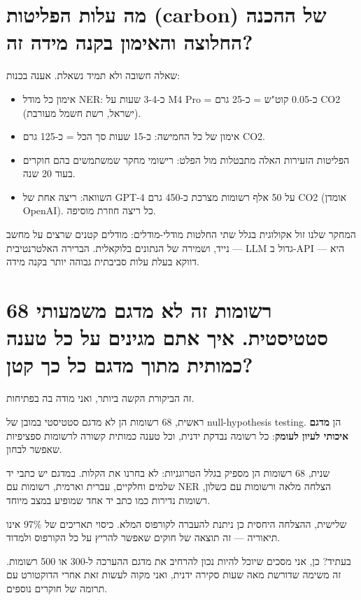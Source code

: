 \documentclass[12pt,a4paper]{article}
\begin{document}
\section{\texthebrew{מה עלות הפליטות (carbon) של ההכנה החלוצה והאימון בקנה מידה זה?}}
\begin{hebrew}
שאלה חשובה ולא תמיד נשאלת. אענה בכנות:
\begin{itemize}
  \item אימון כל מודל NER: כ-3-4 שעות על M4 Pro = כ-0.05 קוט"ש = כ-25 גרם CO2 (ישראל, רשת חשמל מעורבת).
  \item אימון של כל החמישה: כ-15 שעות סך הכל = כ-125 גרם CO2.
  \item הפליטות הזעירות האלה מתבטלות מול הפלט: רישומי מחקר שמשתמשים בהם חוקרים בעוד 20 שנה.
  \item השוואה: ריצה אחת של GPT-4 על 50 אלף רשומות מצרכת כ-450 גרם CO2 (אומדן OpenAI). כל ריצה חוזרת מוסיפה.
\end{itemize}
\par
המחקר שלנו זול אקולוגית בגלל שתי החלטות מודלי-מודלים: מודלים קטנים שרצים על מחשב נייד, ושמירה של הנתונים בלוקאלית. הברירה האלטרנטיבית — LLM גדול ב-API — היא דווקא בעלת עלות סביבתית גבוהה יותר בקנה מידה.
\end{hebrew}


\section{\texthebrew{68 רשומות זה לא מדגם משמעותי סטטיסטית. איך אתם מגינים על כל טענה כמותית מתוך מדגם כל כך קטן?}}
\begin{hebrew}
זה הביקורת הקשה ביותר, ואני מודה בה בפתיחות.
\par
ראשית, 68 רשומות הן לא מדגם סטטיסטי במובן של null-hypothesis testing. הן \textbf{מדגם איכותי לעיון לעומק}: כל רשומה נבדקת ידנית, וכל טענה כמותית קשורה לרשומות ספציפיות שאפשר לבחון.
\par
שנית, 68 רשומות הן מספיק בגלל הטרוגניות: לא בחרנו את הקלות. במדגם יש כתבי יד שלמים וחלקיים, עברית וארמית, רשומות עם NER הצלחה מלאה ורשומות עם כשלון, רשומות נדירות כמו כתב יד אחד שמופיע במצב מיוחד.
\par
שלישית, ההצלחה היחסית כן ניתנת להעברה לקורפוס המלא. כיסוי תאריכים של 97\% אינו תיאוריה — זה תוצאה של חוקים שאפשר להריץ על כל הקורפוס ולמדוד.
\par
בעתיד? כן, אני מסכים שיוכל להיות נכון להרחיב את מדגם ההערכה ל-300 או 500 רשומות. זה משימה שדורשת מאה שעות סקירה ידנית, ואני מקוה לעשות זאת אחרי הדוקטורט עם תרומה של חוקרים נוספים.
\end{hebrew}
\end{document}
